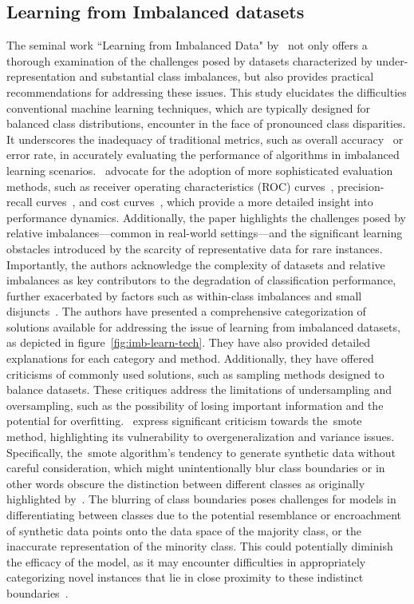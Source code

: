 \subsection{Learning from Imbalanced datasets}
The seminal work ``Learning from Imbalanced Data" by~\citet{5128907Haibo_Imbalance} not only offers a thorough examination of the challenges posed by datasets characterized by under-representation and substantial class imbalances, but also provides practical recommendations for addressing these issues. This study elucidates the difficulties conventional machine learning techniques, which are typically designed for balanced class distributions, encounter in the face of pronounced class disparities. It underscores the inadequacy of traditional metrics, such as overall accuracy~\citep{metric_accuracy_grandini2020metrics} or error rate, in accurately evaluating the performance of algorithms in imbalanced learning scenarios.~\citet{5128907Haibo_Imbalance} advocate for the adoption of more sophisticated evaluation methods, such as receiver operating characteristics (ROC) curves~\citep{ROC_intro_fawcett2006introduction}, precision-recall curves~\citep{precision_recall_giglioni2021use}, and cost curves~\citep{precision_recall_giglioni2021use}, which provide a more detailed insight into performance dynamics. Additionally, the paper highlights the challenges posed by relative imbalances—common in real-world settings—and the significant learning obstacles introduced by the scarcity of representative data for rare instances. Importantly, the authors acknowledge the complexity of datasets and relative imbalances as key contributors to the degradation of classification performance, further exacerbated by factors such as within-class imbalances and small disjuncts~\citep{5128907Haibo_Imbalance}. The authors have presented a comprehensive categorization of solutions available for addressing the issue of learning from imbalanced datasets, as depicted in figure~\ref{fig:imb-learn-tech}. They have also provided detailed explanations for each category and method. Additionally, they have offered criticisms of commonly used solutions, such as sampling methods designed to balance datasets. These critiques address the limitations of undersampling and oversampling, such as the possibility of losing important information and the potential for overfitting.~\citet{5128907Haibo_Imbalance} express significant criticism towards the~\gls{smote}~\citep{H_13_chawla2002smote} method, highlighting its vulnerability to overgeneralization and variance issues. Specifically, the~\gls{smote} algorithm's tendency to generate synthetic data without careful consideration, which might unintentionally blur class boundaries or in other words obscure the distinction between different classes as originally highlighted by~\citep{43_wang2004imbalanced}. The blurring of class boundaries poses challenges for models in differentiating between classes due to the potential resemblance or encroachment of synthetic data points onto the data space of the majority class, or the inaccurate representation of the minority class. This could potentially diminish the efficacy of the model, as it may encounter difficulties in appropriately categorizing novel instances that lie in close proximity to these indistinct boundaries~\citep{43_wang2004imbalanced}.


